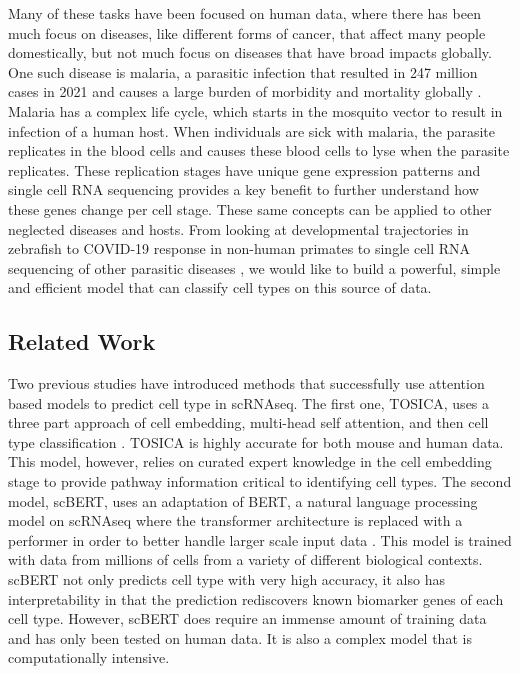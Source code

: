 \documentclass{article}
\begin{document}
Many of these tasks have been focused on human data, where there has been much focus on diseases, like different forms of cancer, that affect many people domestically, but not much focus on diseases that have broad impacts globally. One such disease is malaria, a parasitic infection that resulted in 247 million cases in 2021 and causes a large burden of morbidity and mortality globally \cite{organizationWorldMalariaReport2022}. Malaria has a complex life cycle, which starts in the mosquito vector to result in infection of a human host. When individuals are sick with malaria, the parasite replicates in the blood cells and causes these blood cells to lyse when the parasite replicates. These replication stages have unique gene expression patterns and single cell RNA sequencing provides a key benefit to further understand how these genes change per cell stage. These same concepts can be applied to other neglected diseases and hosts. From looking at developmental trajectories in zebrafish \cite{farrellSinglecellReconstructionDevelopmental2018} to COVID-19 response in non-human primates \cite{speranzaSinglecellRNASequencing2021} to single cell RNA sequencing of other parasitic diseases \cite{briggsSinglecellTranscriptomicAnalysis2021, wendtSinglecellRNAseqAtlas2020, rezvaniComparativeSinglecellTranscriptional2022}, we would like to build a powerful, simple and efficient model that can classify cell types on this source of data.

\subsection{Related Work}

Two previous studies have introduced methods that successfully use attention based models to predict cell type in scRNAseq. The first one, TOSICA, uses a three part approach of cell embedding, multi-head self attention, and then cell type classification \cite{chenTransformerOneStop2023}. TOSICA is highly accurate for both mouse and human data. This model, however, relies on curated expert knowledge in the cell embedding stage to provide pathway information critical to identifying cell types. The second model, scBERT, uses an adaptation of BERT, a natural language processing model on scRNAseq where the transformer architecture is replaced with a performer in order to better handle larger scale input data \cite{yangScBERTLargescalePretrained2022}. This model is trained with data from millions of cells from a variety of different biological contexts. scBERT not only predicts cell type with very high accuracy, it also has interpretability in that the prediction rediscovers known biomarker genes of each cell type. However, scBERT does require an immense amount of training data and has only been tested on human data. It is also a complex model that is computationally intensive. 
\end{document}
